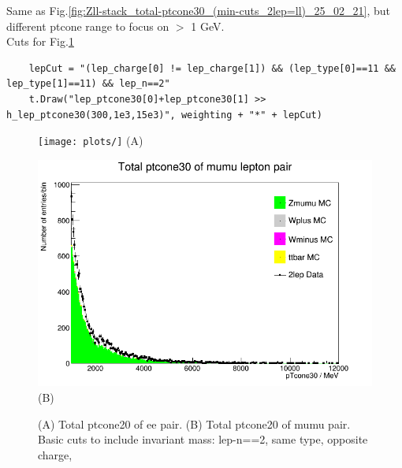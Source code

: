 Same as Fig.\ref{fig:Zll-stack_total-ptcone30_(min-cuts_2lep=ll)_25_02_21}, but different ptcone range to focus on $>$ 1 GeV. 
\\
Cuts for Fig.\ref{fig:Zmumu_Stack_total-ptcone30_(min-cuts_2lep=mumu)_25-02-21}
\begin{lstlisting}
    lepCut = "(lep_charge[0] != lep_charge[1]) && (lep_type[0]==11 && lep_type[1]==11) && lep_n==2"
    t.Draw("lep_ptcone30[0]+lep_ptcone30[1] >> h_lep_ptcone30(300,1e3,15e3)", weighting + "*" + lepCut)
\end{lstlisting}
\begin{figure}[h!]
    \centering
    \begin{minipage}{0.5\textwidth}
        \centering
        \texttt{[image: plots/]}
        (A)
    \end{minipage}\hfill
    \begin{minipage}{0.5\textwidth}
        \centering
        \includegraphics[width=\linewidth]{plots/25-02-2021/Zmumu_Stack_total-ptcone30_(min-cuts_2lep=mumu)_25-02-21_10-30.png}
        (B)
    \end{minipage}
    \caption{(A) Total ptcone20 of ee pair. (B) Total ptcone20 of mumu pair.  Basic cuts to include invariant mass: lep-n==2, same type, opposite charge, }
    \label{fig:Zmumu_Stack_total-ptcone30_(min-cuts_2lep=mumu)_25-02-21}
\end{figure}


